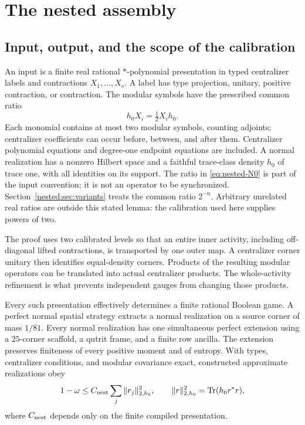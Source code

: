 \section{The nested assembly}\label{nested:sec:nested}
\subsection{Input, output, and the scope of the calibration}
An input is a finite real rational $*$-polynomial presentation in typed
centralizer labels and contractions $X_1,\ldots,X_s$. A label has type
projection, unitary, positive contraction, or contraction. The modular
symbols have the prescribed common ratio
\begin{equation}
 h_0X_i=\tfrac12X_ih_0.                                      \label{eq:nested-N0}
\end{equation}
Each monomial contains at most two modular symbols, counting adjoints;
centralizer coefficients can occur before, between, and after them.
Centralizer polynomial equations and degree-one endpoint equations are
included. A normal realization has a nonzero Hilbert space and a faithful
trace-class density $h_0$ of trace one, with all identities on its support.
The ratio in \eqref{eq:nested-N0} is part of the input convention; it is not an operator to be
synchronized. Section~\ref{nested:sec:variants} treats the common ratio $2^{-n}$.
Arbitrary unrelated real ratios are outside this stated lemma: the
calibration used here supplies powers of two.

The proof uses two calibrated levels so that an entire inner activity,
including off-diagonal lifted contractions, is transported by one outer
map. A centralizer corner unitary then identifies equal-density corners.
Products of the resulting modular operators can be translated into actual
centralizer products. The whole-activity refinement is what prevents
independent gauges from changing those products.

\begin{theorem}\label{nested:thm:nested}
Every such presentation effectively determines a finite rational Boolean
game. A perfect normal spatial strategy extracts a normal realization
on a source corner of mass $1/81$. Every normal realization has one
simultaneous perfect extension using a $25$-corner scaffold, a qutrit
frame, and a finite row ancilla. The extension preserves finiteness of
every positive moment and of entropy. With types, centralizer conditions,
and modular covariance exact, constructed approximate realizations obey
\begin{equation}
 1-\omega\le C_{\rm nest}\sum_j\|r_j\|_{2,h_0}^2,\qquad
 \|r\|_{2,h_0}^2=\operatorname{Tr}(h_0r^*r),                              \label{eq:nested-N1}
\end{equation}
where $C_{\rm nest}$ depends only on the finite compiled presentation.
\end{theorem}

